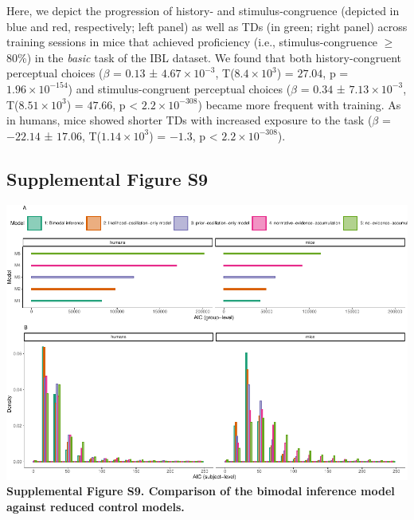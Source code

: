 \documentclass[
]{article}
\begin{document}
Here, we depict the progression of history- and stimulus-congruence
(depicted in blue and red, respectively; left panel) as well as TDs (in
green; right panel) across training sessions in mice that achieved
proficiency (i.e., stimulus-congruence \(\geq\) 80\%) in the
\emph{basic} task of the IBL dataset. We found that both
history-congruent perceptual choices (\(\beta\) = \(0.13\) ±
\(\ensuremath{4.67\times 10^{-3}}\),
T(\(\ensuremath{8.4\times 10^{3}}\)) = \(27.04\), p =
\(\ensuremath{1.96\times 10^{-154}}\)) and stimulus-congruent perceptual
choices (\(\beta\) = \(0.34\) ± \(\ensuremath{7.13\times 10^{-3}}\),
T(\(\ensuremath{8.51\times 10^{3}}\)) = \(47.66\), p < \(\ensuremath{2.2\times 10^{-308}}\)) became
more frequent with training. As in humans, mice showed shorter TDs with
increased exposure to the task (\(\beta\) = \(-22.14\) ± \(17.06\),
T(\(\ensuremath{1.14\times 10^{3}}\)) = \(-1.3\), p < \(\ensuremath{2.2\times 10^{-308}}\)).

\newpage

\hypertarget{supplemental-figure-s9}{%
\subsection{Supplemental Figure S9}\label{supplemental-figure-s9}}

\includegraphics{modes_mouse_rev1b_files/figure-latex/Supplemental_Figure_S9-1.pdf}
\textbf{Supplemental Figure S9. Comparison of the bimodal inference
model against reduced control models.}
\end{document}
